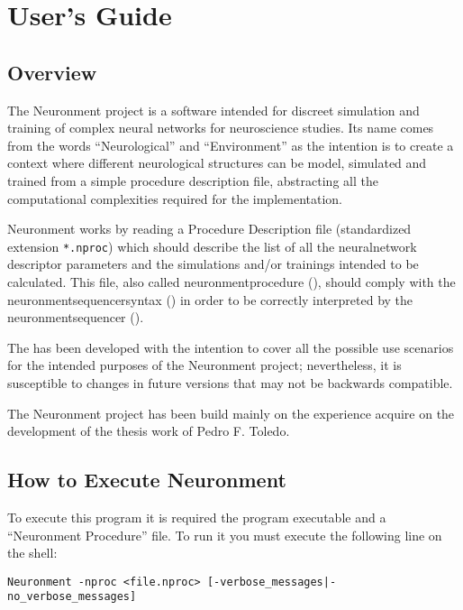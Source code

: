 \chapter{User's Guide}
\label{ch:usersguide}

\section{Overview}

The Neuronment project is a software intended for discreet simulation and training of complex neural networks for neuroscience studies. Its name comes from the words ``Neurological'' and ``Environment'' as the intention is to create a context where different neurological structures can be model, simulated and trained from a simple procedure description file, abstracting all the computational complexities required for the implementation.

Neuronment works by reading a Procedure Description file (standardized extension \texttt{*.nproc}) which should describe the list of all the \gls{neuralnetwork} descriptor parameters and the simulations and/or trainings intended to be calculated. This file, also called  \gls{neuronmentprocedure} (), should comply with the \gls{neuronmentsequencersyntax} () in order to be correctly interpreted by the \gls{neuronmentsequencer} ().

The  has been developed with the intention to cover all the possible use scenarios for the intended purposes of the Neuronment project; nevertheless, it is susceptible to changes in future versions that may not be backwards compatible.

The Neuronment project has been build mainly on the experience acquire on the development of the thesis work of Pedro F. Toledo\cite{thesispedro}.

\section{How to Execute Neuronment}

To execute this program it is required the program executable and a ``Neuronment Procedure'' file. To run it you must execute the following line on the shell:

\begin{verbatim}
Neuronment -nproc <file.nproc> [-verbose_messages|-no_verbose_messages]
\end{verbatim}

